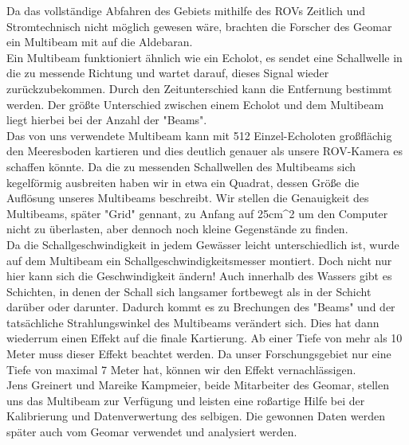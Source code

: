  

Da das vollständige Abfahren des Gebiets mithilfe des ROVs Zeitlich und Stromtechnisch nicht 
möglich gewesen wäre, brachten die Forscher des Geomar ein Multibeam mit auf die Aldebaran. \\

Ein Multibeam funktioniert ähnlich wie ein Echolot, es sendet eine Schallwelle in die zu messende 
Richtung und wartet darauf, dieses Signal wieder zurückzubekommen. Durch den Zeitunterschied 
kann die Entfernung bestimmt werden. Der größte Unterschied zwischen einem Echolot und dem Multibeam 
liegt hierbei bei der Anzahl der "Beams". \\

Das von uns verwendete Multibeam kann mit 512 Einzel-Echoloten großflächig den Meeresboden kartieren und dies 
deutlich genauer als unsere ROV-Kamera es schaffen könnte. Da die zu messenden Schallwellen des Multibeams 
sich kegelförmig ausbreiten haben wir in etwa ein Quadrat, dessen Größe die Auflösung unseres Multibeams beschreibt.
Wir stellen die Genauigkeit des Multibeams, später "Grid" gennant, zu Anfang auf 25cm^2 um den Computer nicht zu überlasten, aber 
dennoch noch kleine Gegenstände zu finden.\\

Da die Schallgeschwindigkeit in jedem Gewässer leicht unterschiedlich ist, wurde auf dem Multibeam
ein Schallgeschwindigkeitsmesser montiert. Doch nicht nur hier kann sich die Geschwindigkeit ändern!
Auch innerhalb des Wassers gibt es Schichten, in denen der Schall sich langsamer fortbewegt als in
der Schicht darüber oder darunter. Dadurch kommt es zu Brechungen des "Beams" und der tatsächliche 
Strahlungswinkel des Multibeams verändert sich. Dies hat dann wiederrum einen Effekt auf die finale Kartierung.
Ab einer Tiefe von mehr als 10 Meter muss dieser Effekt beachtet werden. Da unser Forschungsgebiet nur eine 
Tiefe von maximal 7 Meter hat, können wir den Effekt vernachlässigen.\\

Jens Greinert und Mareike Kampmeier, beide Mitarbeiter des Geomar, stellen uns das Multibeam zur Verfügung und 
leisten eine roßartige Hilfe bei der Kalibrierung und Datenverwertung des selbigen. Die gewonnen Daten werden 
später auch vom Geomar verwendet und analysiert werden. \\


